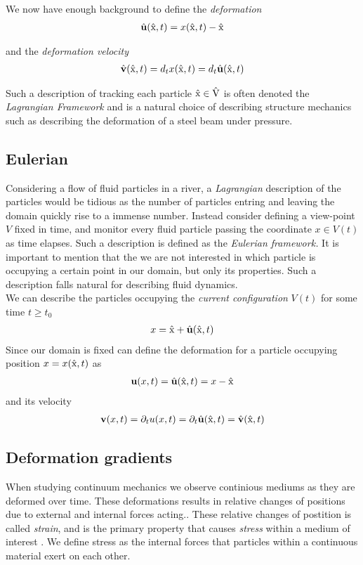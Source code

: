 We now have enough background to define the \textit{deformation} 
\begin{align}
\hat{u}(\ha{x},t) = x(\ha{x},t) - \ha{x} 
\end{align}

and the \textit{deformation velocity}
\begin{align}
\hat{v}(\ha{x},t) = d_t x(\ha{x},t) = d_t \hat{u}(\ha{x},t) 
\end{align}

Such a description of tracking each particle $\text{\^{x}} \in \text{\^{V}}$ is often denoted the \textit{Lagrangian Framework} and is a natural choice of describing structure mechanics such as describing
the deformation of a steel beam under pressure.  
 
\subsection{Eulerian}
Considering a flow of fluid particles in a river, a \textit{Lagrangian} description of the particles would be tidious as the number of particles entring and leaving the domain quickly rise to a immense number. 
Instead consider defining a view-point $V$ fixed in time, and monitor every fluid particle passing the coordinate $x \in V(t)$ as time elapses. Such a description is defined as the \textit{Eulerian framework.} 
It is important to mention that the we are not interested in which particle is occupying a certain point in our domain, but only its properties. Such a description falls natural for describing fluid dynamics. \\
We can describe the particles occupying the \textit{current configuration} $V(t)$ for some time $t \geq t_0$ 
\begin{align*}
x = \ha{x} + \hat{u}(\ha{x}, t)	
\end{align*}
Since our domain is fixed can define the deformation for a particle 
occupying position $x = x(\text{\^{x}},t)$ as
\begin{align*}
\textbf{u}(x, t) = \hat{u}(\ha{x}, t) = x - \ha{x}	\\
\end{align*}
and its velocity
\begin{align*}
\textbf{v}(x,t) = \partial_t u(x,t) = \partial_t \hat{u}(\ha{x},t) = \hat{v}(\ha{x},t)
\end{align*}

\subsection{Deformation gradients}
When studying continuum mechanics we observe continious mediums as they are deformed over time. These deformations
results in relative changes of positions due to external and internal forces acting.. These relative changes of postition is called
\textit{strain}, and is the primary property that causes \textit{stress} within a medium of interest \cite{Richter2016}. We define stress as the internal forces that particles within a continuous material exert on each other. \\

